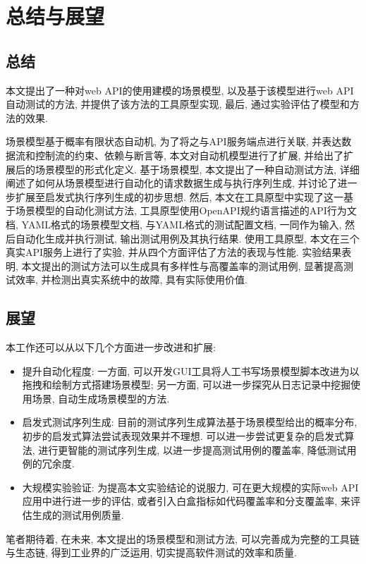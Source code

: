 \chapter{总结与展望}
    
    \section{总结}
        本文提出了一种对web API的使用建模的场景模型, 以及基于该模型进行web API自动测试的方法, 并提供了该方法的工具原型实现, 最后, 通过实验评估了模型和方法的效果.
        
        场景模型基于概率有限状态自动机, 为了将之与API服务端点进行关联, 并表达数据流和控制流的约束、依赖与断言等, 本文对自动机模型进行了扩展, 并给出了扩展后的场景模型的形式化定义. 基于场景模型, 本文提出了一种自动测试方法, 详细阐述了如何从场景模型进行自动化的请求数据生成与执行序列生成, 并讨论了进一步扩展至启发式执行序列生成的初步思想. 然后, 本文在工具原型中实现了这一基于场景模型的自动化测试方法, 工具原型使用OpenAPI规约语言描述的API行为文档, YAML格式的场景模型文档, 与YAML格式的测试配置文档, 一同作为输入, 然后自动化生成并执行测试, 输出测试用例及其执行结果. 使用工具原型, 本文在三个真实API服务上进行了实验, 并从四个方面评估了方法的表现与性能. 实验结果表明, 本文提出的测试方法可以生成具有多样性与高覆盖率的测试用例, 显著提高测试效率, 并检测出真实系统中的故障, 具有实际使用价值.
    
    \section{展望}
    
        本工作还可以从以下几个方面进一步改进和扩展:
        \begin{itemize}
            \item 提升自动化程度: 一方面, 可以开发GUI工具将人工书写场景模型脚本改进为以拖拽和绘制方式搭建场景模型; 另一方面, 可以进一步探究从日志记录中挖掘使用场景, 自动生成场景模型的方法.
            \item 启发式测试序列生成: 目前的测试序列生成算法基于场景模型给出的概率分布, 初步的启发式算法尝试表现效果并不理想. 可以进一步尝试更复杂的启发式算法, 进行更智能的测试序列生成, 以进一步提高测试用例的覆盖率, 降低测试用例的冗余度.
            \item 大规模实验验证: 为提高本文实验结论的说服力, 可在更大规模的实际web API应用中进行进一步的评估, 或者引入白盒指标如代码覆盖率和分支覆盖率, 来评估生成的测试用例质量.
        \end{itemize}
        
        笔者期待着, 在未来, 本文提出的场景模型和测试方法, 可以完善成为完整的工具链与生态链, 得到工业界的广泛运用, 切实提高软件测试的效率和质量.
